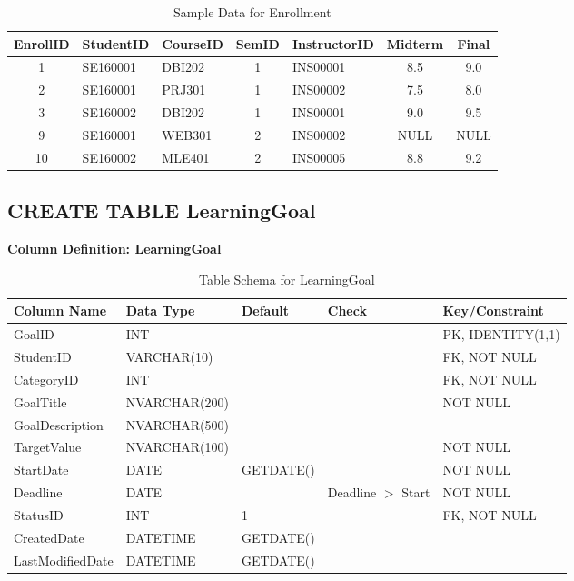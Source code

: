 \documentclass[12pt,a4paper]{report}
\begin{document}
\begin{table}[ht]
\centering
\small
\begin{tabular}{|c|l|l|c|l|c|c|}
\hline
\textbf{EnrollID} & \textbf{StudentID} & \textbf{CourseID} & \textbf{SemID} & \textbf{InstructorID} & \textbf{Midterm} & \textbf{Final} \\ \hline
1 & SE160001 & DBI202 & 1 & INS00001 & 8.5 & 9.0 \\ \hline
2 & SE160001 & PRJ301 & 1 & INS00002 & 7.5 & 8.0 \\ \hline
3 & SE160002 & DBI202 & 1 & INS00001 & 9.0 & 9.5 \\ \hline
9 & SE160001 & WEB301 & 2 & INS00002 & NULL & NULL \\ \hline
10 & SE160002 & MLE401 & 2 & INS00005 & 8.8 & 9.2 \\ \hline
\end{tabular}
\caption{Sample Data for Enrollment}
\label{tab:enrollment_data}
\end{table}

\vspace{1cm}

\subsection{CREATE TABLE LearningGoal}

\textbf{Column Definition: LearningGoal}

\begin{table}[ht]
\centering
\small
\begin{tabular}{|l|l|l|l|l|}
\hline
\textbf{Column Name} & \textbf{Data Type} & \textbf{Default} & \textbf{Check} & \textbf{Key/Constraint} \\ \hline
GoalID & INT & & & PK, IDENTITY(1,1) \\ \hline
StudentID & VARCHAR(10) & & & FK, NOT NULL \\ \hline
CategoryID & INT & & & FK, NOT NULL \\ \hline
GoalTitle & NVARCHAR(200) & & & NOT NULL \\ \hline
GoalDescription & NVARCHAR(500) & & & \\ \hline
TargetValue & NVARCHAR(100) & & & NOT NULL \\ \hline
StartDate & DATE & GETDATE() & & NOT NULL \\ \hline
Deadline & DATE & & Deadline $>$ Start & NOT NULL \\ \hline
StatusID & INT & 1 & & FK, NOT NULL \\ \hline
CreatedDate & DATETIME & GETDATE() & & \\ \hline
LastModifiedDate & DATETIME & GETDATE() & & \\ \hline
\end{tabular}
\caption{Table Schema for LearningGoal}
\label{tab:learning_goal_schema}
\end{table}
\end{document}
